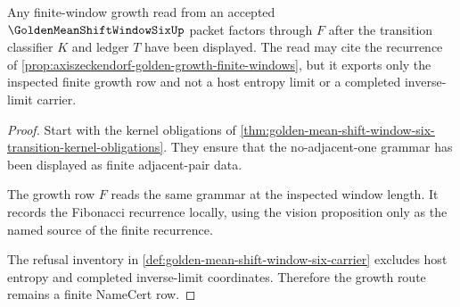 \begin{theorem}
\label{thm:golden-mean-shift-window-six-finite-growth-route}
Any finite-window growth read from an accepted $\GoldenMeanShiftWindowSixUp$ packet factors through $F$ after the transition classifier $K$ and ledger $T$ have been displayed. The read may cite the recurrence of \autoref{prop:axiszeckendorf-golden-growth-finite-windows}, but it exports only the inspected finite growth row and not a host entropy limit or a completed inverse-limit carrier.
\end{theorem}
\begin{proof}
Start with the kernel obligations of \autoref{thm:golden-mean-shift-window-six-transition-kernel-obligations}. They ensure that the no-adjacent-one grammar has been displayed as finite adjacent-pair data.

The growth row $F$ reads the same grammar at the inspected window length. It records the Fibonacci recurrence locally, using the vision proposition only as the named source of the finite recurrence.

The refusal inventory in \autoref{def:golden-mean-shift-window-six-carrier} excludes host entropy and completed inverse-limit coordinates. Therefore the growth route remains a finite NameCert row.
\end{proof}




